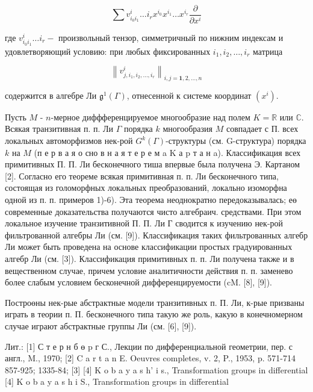 \documentclass[10pt]{article}
\begin{document}
\[

\sum v_{i_{0} i_{1}}^{i} \ldots i_{r} x^{i_{0}} x^{i_{1}} \ldots x^{i_{r}} \frac{\partial}{\partial x^{i}}

\]



где $v_{i_{0} i_{1}}^{i} \ldots i_{r}-$ произвольный тензор, симметричный по нижним индексам и удовлетворяющий условию: при любых фиксированных $i_{1}, i_{2}, \ldots, i_{r}$ матрица



\[

\left\|v_{j, i_{1}, i_{2}, \ldots, i_{r}}^{i}\right\|_{i, j=\mathbf{1}, 2, \ldots, n}

\]



содержится в алгебре Ли $\mathfrak{g}^{1}(\Gamma)$, отнесенной к системе координат $\left(x^{i}\right)$.



Пусть $M$ - $n$-мерное диффференцируемое многообразие над полем $K=\mathbb{R}$ или $\mathbb{C}$. Всякая транзитивная п. п. Ли $\Gamma$ порядка $k$ многообразия $M$ совпадает с П. всех локальных автоморфизмов нек-рой $G^{k}(\Gamma)$-структуры (см. G-структура) порядка $k$ на $M$ (п е р в а я о сно в н а я т е р е м a $\mathrm{K}$ а $\mathrm{p}$ т а н a). Классификация всех примитивных П. П. Ли бесконечного тиша впервые была получена Э. Картаном [2]. Согласно его теореме всякая примитивная п. п. Ли бесконечного типа, состоящая из голоморфных локальных преобразований, локально изоморфна одной из п. п. примеров 1)-6). Эта теорема неоднократно передоказывалась; еө современные доказательства получаются чисто алгебраич. средствами. При этом локальное изучение транзитивной П. П. Ли Г сводится к изучению нек-рой фильтрованной алгебры Ли (см. [9]). Классификация таких фильтрованных алгебр Ли может быть проведена на основе классификации простых градуированных алгебр Ли (см. [3]). Классификация примитивных п. п. Ли получена также и в вещественном случае, причем условие аналитичности действия п. п. заменево более слабым условием бесконечной дифференцируемости (cM. [8], [9]).



Построөны нек-рые абстрактные модели транзитивных п. П. Ли, к-рые призваны играть в теории п. П. бесконечного типа такую же роль, какую в конечномерном случае играют абстрактные группы Ли (см. [6], [9]).



Лит.: [1] С т е р н б ө p г С., Лекции по дифференциальной геометрии, пер. с англ., M., 1970; [2] C a r t a n E. Oeuvres completes, v. 2, P., 1953, p. 571-714 857-925; 1335-84; [3] [4] K o b a y a s h' i s., Transformation groups in differential [4] K o b a y a s h i S., Transformation groups in differential
\end{document}
